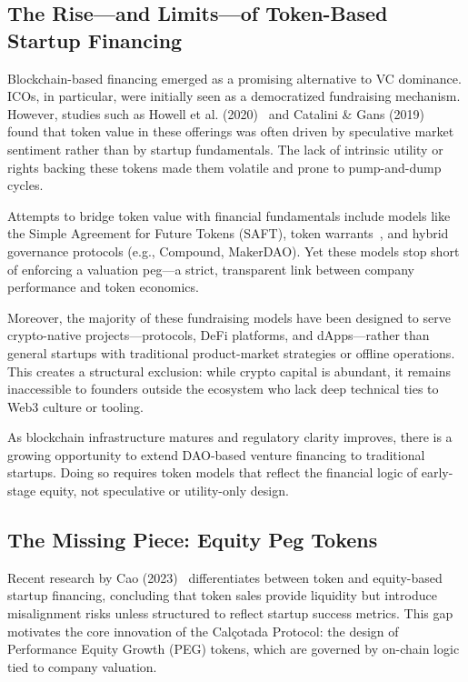 \documentclass[conference]{IEEEtran}
\begin{document}
\subsection{The Rise—and Limits—of Token-Based Startup Financing}
Blockchain-based financing emerged as a promising alternative to VC dominance. ICOs, in particular, were initially seen as a democratized fundraising mechanism. However, studies such as Howell et al. (2020)~\cite{howell2020initial} and Catalini \& Gans (2019)~\cite{catalini2019some} found that token value in these offerings was often driven by speculative market sentiment rather than by startup fundamentals. The lack of intrinsic utility or rights backing these tokens made them volatile and prone to pump-and-dump cycles.

Attempts to bridge token value with financial fundamentals include models like the Simple Agreement for Future Tokens (SAFT), token warrants~\cite{lw2019token}, and hybrid governance protocols (e.g., Compound, MakerDAO). Yet these models stop short of enforcing a valuation peg—a strict, transparent link between company performance and token economics.

Moreover, the majority of these fundraising models have been designed to serve crypto-native projects—protocols, DeFi platforms, and dApps—rather than general startups with traditional product-market strategies or offline operations. This creates a structural exclusion: while crypto capital is abundant, it remains inaccessible to founders outside the ecosystem who lack deep technical ties to Web3 culture or tooling.

As blockchain infrastructure matures and regulatory clarity improves, there is a growing opportunity to extend DAO-based venture financing to traditional startups. Doing so requires token models that reflect the financial logic of early-stage equity, not speculative or utility-only design.

\subsection{The Missing Piece: Equity Peg Tokens}

Recent research by Cao (2023)~\cite{cao2023token} differentiates between token and equity-based startup financing, concluding that token sales provide liquidity but introduce misalignment risks unless structured to reflect startup success metrics. This gap motivates the core innovation of the Calçotada Protocol: the design of Performance Equity Growth (PEG) tokens, which are governed by on-chain logic tied to company valuation.
\end{document}

